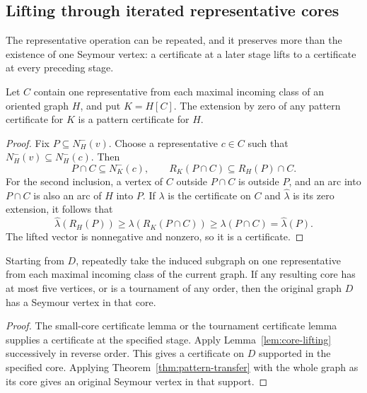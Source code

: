 \subsection{Lifting through iterated representative cores}

The representative operation can be repeated, and it preserves more
than the existence of one Seymour vertex: a certificate at a later
stage lifts to a certificate at every preceding stage.

\begin{lemma}
\label{lem:core-lifting}
Let $C$ contain one representative from each maximal incoming class of
an oriented graph $H$, and put $K=H[C]$. The extension by zero of any
pattern certificate for $K$ is a pattern certificate for $H$.
\end{lemma}
\begin{proof}
Fix $P\subseteq N_H^-(v)$. Choose a representative $c\in C$ such
that $N_H^-(v)\subseteq N_H^-(c)$. Then
\[
 P\cap C\subseteq N_K^-(c),
 \qquad R_K(P\cap C)\subseteq R_H(P)\cap C.
\]
For the second inclusion, a vertex of $C$ outside $P\cap C$ is
outside $P$, and an arc into $P\cap C$ is also an arc of $H$ into
$P$. If $\lambda$ is the certificate on $C$ and
$\widehat\lambda$ is its zero extension, it follows that
\[
 \widehat\lambda(R_H(P))
 \geq\lambda(R_K(P\cap C))
 \geq\lambda(P\cap C)
 =\widehat\lambda(P).
\]
The lifted vector is nonnegative and nonzero, so it is a certificate.
\end{proof}

\begin{corollary}
\label{cor:paper-iterated-core-sufficient}
Starting from $D$, repeatedly take the induced subgraph on one
representative from each maximal incoming class of the current graph.
If any resulting core has at most five vertices, or is a tournament
of any order, then the original graph $D$ has a Seymour vertex in that
core.
\end{corollary}
\begin{proof}
The small-core certificate lemma or the tournament certificate lemma
supplies a certificate at the specified stage. Apply
Lemma~\ref{lem:core-lifting} successively in reverse order. This gives
a certificate on $D$ supported in the specified core. Applying
Theorem~\ref{thm:pattern-transfer} with the whole graph as its core
gives an original Seymour vertex in that support.
\end{proof}

